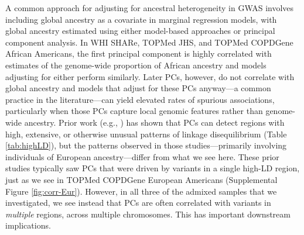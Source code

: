 \documentclass[12pt]{article}
\begin{document}
A common approach for adjusting for ancestral heterogeneity in GWAS involves including global ancestry as a covariate in marginal regression models, with global ancestry estimated using either model-based approaches or principal component analysis.
In WHI SHARe, TOPMed JHS, and TOPMed COPDGene African Americans, the first principal component is highly correlated with estimates of the genome-wide proportion of African ancestry %
and models adjusting for either perform similarly.
Later PCs, however, do not correlate with global ancestry and models that adjust for these PCs anyway---a common practice in the literature---can yield elevated rates of spurious associations, particularly when those PCs capture local genomic features rather than genome-wide ancestry.  %
Prior work (e.g., \citep{zou2010, prive2020}) has shown that PCs can detect regions with high, extensive, or otherwise unusual patterns of linkage disequilibrium (Table \ref{tab:highLD}), but the patterns observed in those studies---primarily involving individuals of European ancestry---differ from what we see here.
These prior studies typically saw PCs that were driven by variants in a single high-LD region, just as we see in TOPMed COPDGene European Americans (Supplemental Figure \ref{fig:corr-Eur}).
However, in all three of the admixed samples that we investigated, we see instead that PCs are often correlated with variants in \textit{multiple} regions, across multiple chromosomes. 
This has important downstream implications.
\end{document}
